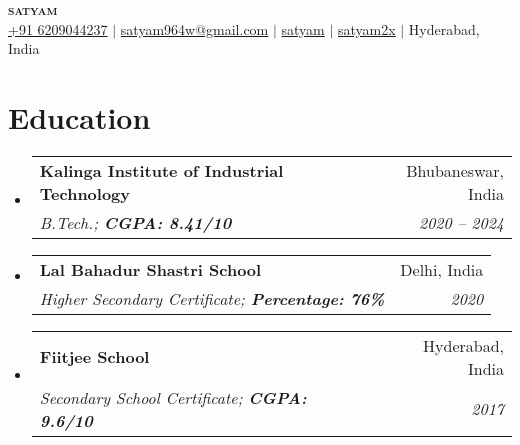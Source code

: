 \documentclass[letterpaper,10pt]{article}
\makeatletter
\newcommand{\resumeItem}[1]{
  \item\small{
    {#1 \vspace{-2pt}}
  }
}
\newcommand{\resumeEducationHeading}[4]{
  \vspace{-2pt}\item
    \begin{tabular*}{0.97\textwidth}[t]{l@{\extracolsep{\fill}}r}
      \textbf{#1} & #2 \\
      \textit{\small#3} & \textit{\small #4} \\
    \end{tabular*}\vspace{-5pt}
}
\newcommand{\resumeSubHeadingListStart}{\begin{itemize}[leftmargin=0.15in, label={}]}
\newcommand{\resumeSubHeadingListEnd}{\end{itemize}}
\makeatother
\begin{document}
\begin{center}
    \textbf{\Huge \scshape satyam} \\ \vspace{3pt}
    \small
    \faMobile \hspace{.5pt} \href{tel:6209044237}{+91 6209044237}
    $|$
    \faAt \hspace{.5pt} \href{mailto:satyam964w@gmail.com}{satyam964w@gmail.com}
    $|$
    \faLinkedinSquare \hspace{.5pt} \href{https://www.linkedin.com/in/satyamw/}{satyam}
    $|$
    \faGithub \hspace{.5pt} \href{https://github.com/satyam2x}{satyam2x}
    $|$
    \faMapMarker \hspace{.5pt} Hyderabad, India
\end{center}


\section{Education}
  \vspace{1pt}
  \resumeSubHeadingListStart
    \resumeEducationHeading
      {Kalinga Institute of Industrial Technology}{Bhubaneswar, India}
      {B.Tech.; \textbf{CGPA: 8.41/10}}{2020 -- 2024}
    \resumeEducationHeading
      {Lal Bahadur Shastri School}{Delhi, India}
      {Higher Secondary Certificate; \textbf{Percentage: 76\%}}{2020}
      \resumeEducationHeading
      {Fiitjee School}{Hyderabad, India}
      {Secondary School Certificate; \textbf{CGPA: 9.6/10}}{2017}
  \resumeSubHeadingListEnd

\end{document}

